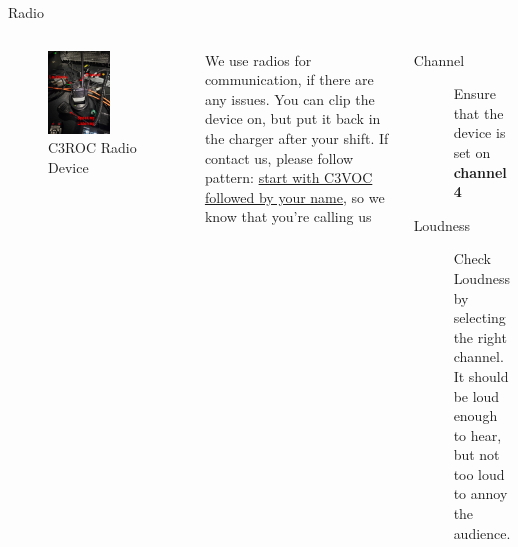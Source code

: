 \documentclass[aspectratio=169]{beamer}
\begin{document}
\begin{frame}{Radio}
	\begin{columns}[T,onlytextwidth]
		\begin{figure} 
			\centering
			\includegraphics[width=0.65\textwidth]{images/radio.png}
			\caption{C3ROC Radio Device}
		\end{figure}
		We use radios for communication, if there are any issues. 
		You can clip the device on, but put it back in the charger after your shift. 	If contact us, please follow pattern:  \underline{start with C3VOC followed by your name}, so we know that you're calling us
		\begin{description}
			\item[Channel] Ensure that the device is set on \textbf{ channel 4 }
			\item[Loudness] Check Loudness by selecting the right channel.  It should be loud enough to hear, but not too loud to annoy the audience.
		\end{description}
	\end{columns}
\end{frame}
\end{document}
